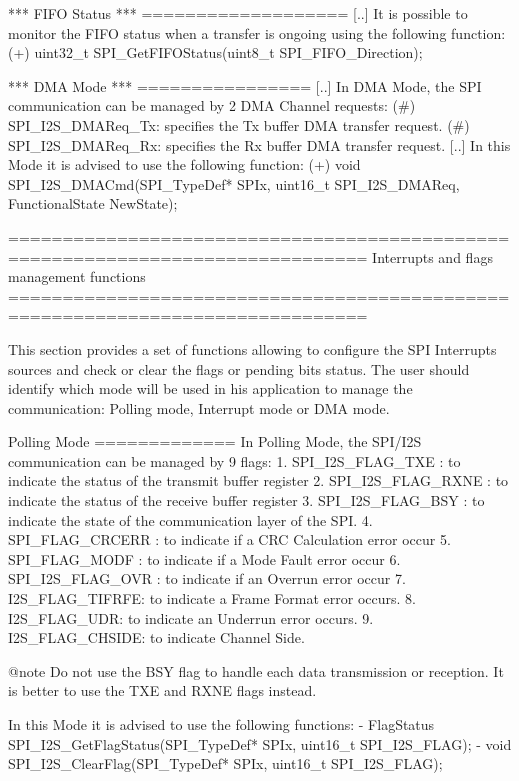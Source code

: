 \begin{DoxyVerb}
  *** FIFO Status ***
  ===================
    [..] It is possible to monitor the FIFO status when a transfer is ongoing using the
         following function:
         (+) uint32_t SPI_GetFIFOStatus(uint8_t SPI_FIFO_Direction); 

  *** DMA Mode ***
  ================
    [..] In DMA Mode, the SPI communication can be managed by 2 DMA Channel requests:
         (#) SPI_I2S_DMAReq_Tx: specifies the Tx buffer DMA transfer request.
         (#) SPI_I2S_DMAReq_Rx: specifies the Rx buffer DMA transfer request.
    [..] In this Mode it is advised to use the following function:
         (+) void SPI_I2S_DMACmd(SPI_TypeDef* SPIx, uint16_t SPI_I2S_DMAReq, FunctionalState NewState);\end{DoxyVerb}


\begin{DoxyVerb} ===============================================================================
                         Interrupts and flags management functions
 ===============================================================================  

  This section provides a set of functions allowing to configure the SPI Interrupts 
  sources and check or clear the flags or pending bits status.
  The user should identify which mode will be used in his application to manage 
  the communication: Polling mode, Interrupt mode or DMA mode. 
    
  Polling Mode
  =============
  In Polling Mode, the SPI/I2S communication can be managed by 9 flags:
     1. SPI_I2S_FLAG_TXE : to indicate the status of the transmit buffer register
     2. SPI_I2S_FLAG_RXNE : to indicate the status of the receive buffer register
     3. SPI_I2S_FLAG_BSY : to indicate the state of the communication layer of the SPI.
     4. SPI_FLAG_CRCERR : to indicate if a CRC Calculation error occur              
     5. SPI_FLAG_MODF : to indicate if a Mode Fault error occur
     6. SPI_I2S_FLAG_OVR : to indicate if an Overrun error occur
     7. I2S_FLAG_TIFRFE: to indicate a Frame Format error occurs.
     8. I2S_FLAG_UDR: to indicate an Underrun error occurs.
     9. I2S_FLAG_CHSIDE: to indicate Channel Side.

@note Do not use the BSY flag to handle each data transmission or reception.  It is
      better to use the TXE and RXNE flags instead.

  In this Mode it is advised to use the following functions:
     - FlagStatus SPI_I2S_GetFlagStatus(SPI_TypeDef* SPIx, uint16_t SPI_I2S_FLAG);
     - void SPI_I2S_ClearFlag(SPI_TypeDef* SPIx, uint16_t SPI_I2S_FLAG);


\end{DoxyVerb}
